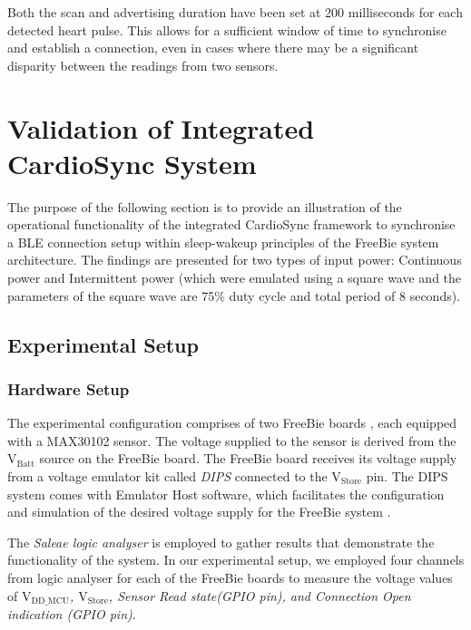 \noindent Both the scan and advertising duration have been set at 200 milliseconds for each detected heart pulse. This allows for a sufficient window of time to synchronise and establish a connection, even in cases where there may be a significant disparity between the readings from two sensors.


\section{Validation of Integrated CardioSync System}
The purpose of the following section is to provide an illustration of the operational functionality of the integrated CardioSync framework to synchronise a BLE connection setup within sleep-wakeup principles of the FreeBie system architecture. The findings are presented for two types of input power: Continuous power and Intermittent power (which were emulated using a square wave and the parameters of the square wave are 75\% duty cycle and total period of 8 seconds).

\subsection{Experimental Setup}
\label{sec:experimental_setup}
\subsubsection{Hardware Setup}
The experimental configuration comprises of two FreeBie boards \cite{Researchers}, each equipped with a MAX30102 sensor. The voltage supplied to the sensor is derived from the \(\text{V}_\text{Batt}\) source on the FreeBie board. The FreeBie board receives its voltage supply from a voltage emulator kit called \textit{DIPS} \cite{DIPSGitHub} connected to the \(\text{V}_\text{Store}\) pin. The DIPS system comes with Emulator Host software, which facilitates the configuration and simulation of the desired voltage supply for the FreeBie system \cite{DIPSGitHub}.
\vspace{1\baselineskip}

\noindent The \textit{Saleae logic analyser} \cite{LogicAnalyser} is employed to gather results that demonstrate the functionality of the system. In our experimental setup, we employed four channels from logic analyser for each of the FreeBie boards to measure the voltage values of \textit{\(\text{V}_\text{DD\_MCU}\), \(\text{V}_\text{Store}\), Sensor Read state(GPIO pin), and Connection Open indication (GPIO pin)}.
\vspace{1\baselineskip}

